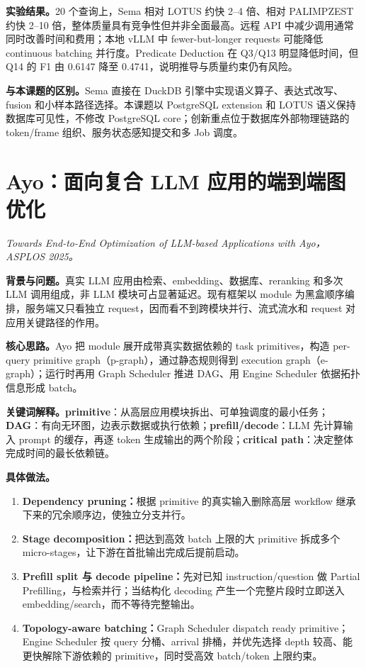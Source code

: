 \documentclass[10pt,a4paper]{ctexart}
\let\digestoriginalsection\section
\renewcommand{\section}{\Needspace{7\baselineskip}\digestoriginalsection}
\newcommand{\paperinfo}[1]{\textit{#1}\par}
\newcommand{\field}[1]{\par\noindent\textbf{#1。}\hspace{0.25em}}
\begin{document}
\field{实验结果}20 个查询上，Sema 相对 LOTUS 约快 2--4 倍、相对 PALIMPZEST 约快 2--10 倍，整体质量具有竞争性但并非全面最高。远程 API 中减少调用通常同时改善时间和费用；本地 vLLM 中 fewer-but-longer requests 可能降低 continuous batching 并行度。Predicate Deduction 在 Q3/Q13 明显降低时间，但 Q14 的 F1 由 0.6147 降至 0.4741，说明推导与质量约束仍有风险。

\field{与本课题的区别}Sema 直接在 DuckDB 引擎中实现语义算子、表达式改写、fusion 和小样本路径选择。本课题以 PostgreSQL extension 和 LOTUS 语义保持数据库可见性，不修改 PostgreSQL core；创新重点位于数据库外部物理链路的 token/frame 组织、服务状态感知提交和多 Job 调度。

\section{Ayo：面向复合 LLM 应用的端到端图优化}
\paperinfo{Towards End-to-End Optimization of LLM-based Applications with Ayo，ASPLOS 2025。}

\field{背景与问题}真实 LLM 应用由检索、embedding、数据库、reranking 和多次 LLM 调用组成，非 LLM 模块可占显著延迟。现有框架以 module 为黑盒顺序编排，服务端又只看独立 request，因而看不到跨模块并行、流式流水和 request 对应用关键路径的作用。

\field{核心思路}Ayo 把 module 展开成带真实数据依赖的 task primitives，构造 per-query primitive graph（p-graph），通过静态规则得到 execution graph（e-graph）；运行时再用 Graph Scheduler 推进 DAG、用 Engine Scheduler 依据拓扑信息形成 batch。

\field{关键词解释}\textbf{primitive}：从高层应用模块拆出、可单独调度的最小任务；\textbf{DAG}：有向无环图，边表示数据或执行依赖；\textbf{prefill/decode}：LLM 先计算输入 prompt 的缓存，再逐 token 生成输出的两个阶段；\textbf{critical path}：决定整体完成时间的最长依赖链。

\field{具体做法}
\begin{enumerate}
  \item \textbf{Dependency pruning：}根据 primitive 的真实输入删除高层 workflow 继承下来的冗余顺序边，使独立分支并行。
  \item \textbf{Stage decomposition：}把达到高效 batch 上限的大 primitive 拆成多个 micro-stages，让下游在首批输出完成后提前启动。
  \item \textbf{Prefill split 与 decode pipeline：}先对已知 instruction/question 做 Partial Prefilling，与检索并行；当结构化 decoding 产生一个完整片段时立即送入 embedding/search，而不等待完整输出。
  \item \textbf{Topology-aware batching：}Graph Scheduler dispatch ready primitive；Engine Scheduler 按 query 分桶、arrival 排桶，并优先选择 depth 较高、能更快解除下游依赖的 primitive，同时受高效 batch/token 上限约束。
\end{enumerate}
\end{document}
